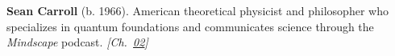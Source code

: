 \textbf{Sean Carroll} (b. 1966). American theoretical physicist and philosopher who specializes in quantum foundations and communicates science through the \emph{Mindscape} podcast. \emph{[Ch.~\hyperref[ch:acceleratinguniverse]{02}]}

